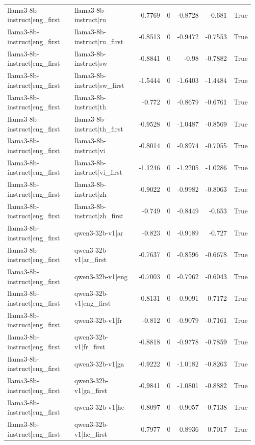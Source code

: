 \begin{table}
\begin{tabular}{l l r r r r l}
llama3-8b-instruct|eng_first & llama3-8b-instruct|ru & -0.7769 & 0 & -0.8728 & -0.681 & True \\
llama3-8b-instruct|eng_first & llama3-8b-instruct|ru_first & -0.8513 & 0 & -0.9472 & -0.7553 & True \\
llama3-8b-instruct|eng_first & llama3-8b-instruct|sw & -0.8841 & 0 & -0.98 & -0.7882 & True \\
llama3-8b-instruct|eng_first & llama3-8b-instruct|sw_first & -1.5444 & 0 & -1.6403 & -1.4484 & True \\
llama3-8b-instruct|eng_first & llama3-8b-instruct|th & -0.772 & 0 & -0.8679 & -0.6761 & True \\
llama3-8b-instruct|eng_first & llama3-8b-instruct|th_first & -0.9528 & 0 & -1.0487 & -0.8569 & True \\
llama3-8b-instruct|eng_first & llama3-8b-instruct|vi & -0.8014 & 0 & -0.8974 & -0.7055 & True \\
llama3-8b-instruct|eng_first & llama3-8b-instruct|vi_first & -1.1246 & 0 & -1.2205 & -1.0286 & True \\
llama3-8b-instruct|eng_first & llama3-8b-instruct|zh & -0.9022 & 0 & -0.9982 & -0.8063 & True \\
llama3-8b-instruct|eng_first & llama3-8b-instruct|zh_first & -0.749 & 0 & -0.8449 & -0.653 & True \\
llama3-8b-instruct|eng_first & qwen3-32b-v1|ar & -0.823 & 0 & -0.9189 & -0.727 & True \\
llama3-8b-instruct|eng_first & qwen3-32b-v1|ar_first & -0.7637 & 0 & -0.8596 & -0.6678 & True \\
llama3-8b-instruct|eng_first & qwen3-32b-v1|eng & -0.7003 & 0 & -0.7962 & -0.6043 & True \\
llama3-8b-instruct|eng_first & qwen3-32b-v1|eng_first & -0.8131 & 0 & -0.9091 & -0.7172 & True \\
llama3-8b-instruct|eng_first & qwen3-32b-v1|fr & -0.812 & 0 & -0.9079 & -0.7161 & True \\
llama3-8b-instruct|eng_first & qwen3-32b-v1|fr_first & -0.8818 & 0 & -0.9778 & -0.7859 & True \\
llama3-8b-instruct|eng_first & qwen3-32b-v1|ga & -0.9222 & 0 & -1.0182 & -0.8263 & True \\
llama3-8b-instruct|eng_first & qwen3-32b-v1|ga_first & -0.9841 & 0 & -1.0801 & -0.8882 & True \\
llama3-8b-instruct|eng_first & qwen3-32b-v1|he & -0.8097 & 0 & -0.9057 & -0.7138 & True \\
llama3-8b-instruct|eng_first & qwen3-32b-v1|he_first & -0.7977 & 0 & -0.8936 & -0.7017 & True \\

\end{tabular}
\end{table}
